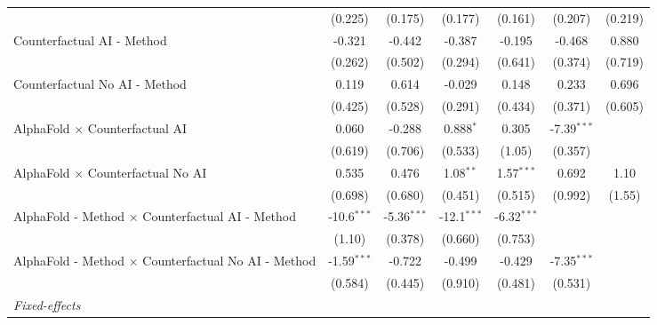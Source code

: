 \begin{tabular}{lcccccc}
                                                              & (0.225)       & (0.175)        & (0.177)       & (0.161)       & (0.207)       & (0.219)\\   
   Counterfactual AI - Method                                 & -0.321        & -0.442         & -0.387        & -0.195        & -0.468        & 0.880\\   
                                                              & (0.262)       & (0.502)        & (0.294)       & (0.641)       & (0.374)       & (0.719)\\   
   Counterfactual No AI - Method                              & 0.119         & 0.614          & -0.029        & 0.148         & 0.233         & 0.696\\   
                                                              & (0.425)       & (0.528)        & (0.291)       & (0.434)       & (0.371)       & (0.605)\\   
   AlphaFold $\times$ Counterfactual AI                       & 0.060         & -0.288         & 0.888$^{*}$   & 0.305         & -7.39$^{***}$ &   \\   
                                                              & (0.619)       & (0.706)        & (0.533)       & (1.05)        & (0.357)       &   \\   
   AlphaFold $\times$ Counterfactual No AI                    & 0.535         & 0.476          & 1.08$^{**}$   & 1.57$^{***}$  & 0.692         & 1.10\\   
                                                              & (0.698)       & (0.680)        & (0.451)       & (0.515)       & (0.992)       & (1.55)\\   
   AlphaFold - Method $\times$ Counterfactual AI - Method     & -10.6$^{***}$ & -5.36$^{***}$  & -12.1$^{***}$ & -6.32$^{***}$ &               &   \\   
                                                              & (1.10)        & (0.378)        & (0.660)       & (0.753)       &               &   \\   
   AlphaFold - Method $\times$ Counterfactual No AI - Method  & -1.59$^{***}$ & -0.722         & -0.499        & -0.429        & -7.35$^{***}$ &   \\   
                                                              & (0.584)       & (0.445)        & (0.910)       & (0.481)       & (0.531)       &   \\   
   \midrule
   \emph{Fixed-effects}\\

\end{tabular}
